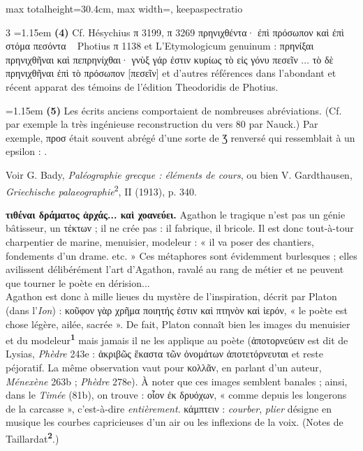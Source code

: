 \documentclass[11pt,twoside]{book}
\newcommand{\renverse}[1]{\rotatebox[origin=c]{180}{#1}}
\newcommand{\italique}[1]{\textit{#1}}
\newcommand{\expo}[1]{\textsuperscript{#1}}
\newcommand{\marqueur}[1]{\textsuperscript{\color{rubricRed}\textbf{#1}}}
\begin{document}
\begin{adjustbox}{max totalheight=30.4cm, max width=\textwidth, keepaspectratio}
\begin{minipage}{\textwidth}
{\begin{multicols}{3}
\noindent\hangindent=1.15em {\color{sepiaNote}\textbf{(4)}} Cf. Hésychius π 3199, π 3269 πρηνιχθέντα· ἐπὶ πρόσωπον καὶ ἐπὶ στόμα πεσόντα ~ Photius π 1138 et L'Etymologicum genuinum : πρηνίξαι πρηνιχθῆναι καὶ πεπρηνίχθαι· γνὺξ γάρ ἐστιν κυρίως τὸ εἰς γόνυ πεσεῖν ... τὸ δὲ πρηνιχθῆναι ἐπὶ τὸ πρόσωπον [πεσεῖν] et d'autres références dans l'abondant et récent apparat des témoins de l'édition Theodoridis de Photius.
\par\vspace{1.5pt}
\noindent\hangindent=1.15em {\color{sepiaNote}\textbf{(5)}} Les écrits anciens comportaient de nombreuses abréviations. (Cf. par exemple la très ingénieuse reconstruction du vers 80 par Nauck.) Par exemple, προσ était souvent abrégé d'une sorte de Ʒ renversé qui ressemblait à un epsilon : \renverse{Ʒ}.
\par\vspace{1.5pt}
\noindent Voir G. Bady, \italique{Paléographie grecque : éléments de cours}, ou bien V. Gardthausen, \italique{Griechische palaeographie}\expo{2}, II (1913), p. 340.
\par\vspace{1.5pt}
 \textbf{τιθέναι δράματος ἀρχάς... καὶ χοανεύει.} Agathon le tragique n'est pas un génie bâtisseur, un τέκτων ; il ne crée pas : il fabrique, il bricole. Il est donc tout-à-tour charpentier de marine, menuisier, modeleur : « il va poser des chantiers, fondements d'un drame. etc. » Ces métaphores sont évidemment burlesques ; elles avilissent délibérément l'art d'Agathon, ravalé au rang de métier et ne peuvent que tourner le poète en dérision...\\ Agathon est donc à mille lieues du mystère de l'inspiration, décrit par Platon (dans l'\italique{Ion}) : κοῦφον γὰρ χρῆμα ποιητής ἐστιν καὶ πτηνὸν καὶ ἱερόν, « le poète est chose légère, ailée, sacrée ». De fait, Platon connaît bien les images du menuisier et du modeleur\marqueur{1} mais jamais il ne les applique au poète (ἀποτορνεύειν est dit de Lysias, \italique{Phèdre} 243e : ἀκριβῶς ἕκαστα τῶν ὀνομάτων ἀποτετόρνευται et reste péjoratif. La même observation vaut pour κολλᾶν, en parlant d'un auteur, \italique{Ménexène} 263b ; \italique{Phèdre} 278e). À noter que ces images semblent banales ; ainsi, dans le \italique{Timée} (81b), on trouve : οἷον ἐκ δρυόχων, « comme depuis les longerons de la carcasse », c'est-à-dire \italique{entièrement}. κάμπτειν : \italique{courber}, \italique{plier} désigne en musique les courbes capricieuses d'un air ou les inflexions de la voix. (Notes de Taillardat\marqueur{2}.)

\end{multicols}}
\end{minipage}
\end{adjustbox}
\end{document}
